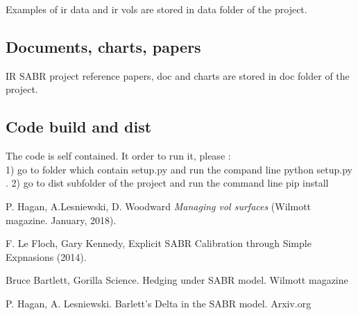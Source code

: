 \documentclass[preprint,pre,floats,aps,amsmath,amssymb]{revtex4}
\numberwithin{equation}{section}
\begin{document}
Examples of ir data and ir vols are stored in data folder of the project.


\subsection{Documents, charts, papers}

IR SABR project reference papers, doc and charts are stored in doc folder of the project.


\subsection{Code build and dist}


The code is self contained. It order to run it, please : \\
1) go to  folder which contain setup.py and run the compand line python setup.py .
2) go to dist subfolder of the project and run the command line pip install 



\begin{thebibliography}{99}


 P. Hagan, A.Lesniewski, D. Woodward {\it Managing vol surfaces} (Wilmott magazine. January, 2018).

 F. Le Floch, Gary Kennedy, Explicit SABR Calibration through Simple Expnasions (2014).

 Bruce Bartlett, Gorilla Science. Hedging under SABR model. Wilmott magazine

 P. Hagan, A. Lesniewski. Barlett's Delta in the SABR model. Arxiv.org

\end{thebibliography}
\end{document}
